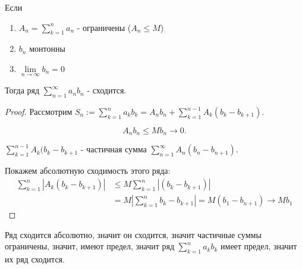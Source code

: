 \begin{theorem} \thmslashn

    Если
    \begin{enumerate}
        \item $A_{n} = \sum\limits_{k=1}^{n} a_{n}$ - ограничены ($A_{n} \le M$)
        \item $b_{n}$ монтонны
        \item $\lim\limits_{n \to \infty} b_{n} = 0$
    \end{enumerate}

    Тогда ряд $\sum\limits_{n=1}^{\infty} a_{n}b_{n}$ - сходится.
    \begin{proof} \thmslashn
    
        Рассмотрим $S_{n} := \sum\limits_{k=1}^{n} a_{k}b_{k} = A_{n}b_{n} + \sum\limits_{k=1}^{n-1} A_{k}(b_{k} - b_{k+1})$.

        \[ A_{n}b_{n} \le M b_{n} \to 0 .\]
        
        $\sum\limits_{k=1}^{n-1} A_{k}(b_{k}-b_{k+1}$ - частичная сумма $\sum\limits_{n=1}^{\infty} A_{n}(b_{n} - b_{n+1})$.

        Покажем абсолютную сходимость этого ряда:
        \begin{equation*}
            \begin{split}
                \sum\limits_{k=1}^{n} |A_{k}(b_{k}-b_{k+1})|
                &\le M \sum\limits_{k=1}^{n} |(b_{k} - b_{k+1})|\\
                &= M \left|\sum\limits_{k=1}^{n} b_{k} - b_{k+1}\right| = M(b_1 - b_{n+1}) \to Mb_1 
            \end{split}
        \end{equation*}
    \end{proof}

    Ряд сходится абсолютно, значит он сходится, значит частичные суммы ограничены, значит, имеют предел, значит ряд $\sum\limits_{k=1}^{n} a_{k}b_{k}$ имеет предел, значит их ряд сходится.
\end{theorem}
